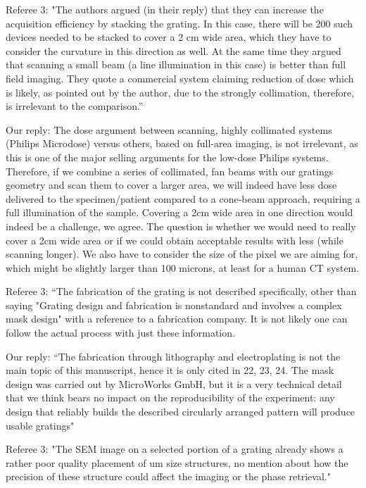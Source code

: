 \documentclass[a4paper,english]{scrartcl} \usepackage[detect-all]{siunitx}
\begin{document}
Referee 3: "The authors argued (in their reply) that they can increase the
acquisition efficiency by stacking the grating. In this case, there will be
200 such devices needed to be stacked to cover a 2 cm wide area, which they
have to consider the curvature in this direction as well. At the same time
they argued that scanning a small beam (a line illumination in this case) is
better than full field imaging. They quote a commercial system claiming
reduction of dose which is likely, as pointed out by the author, due to the
strongly collimation, therefore, is irrelevant to the comparison.”

Our reply: The dose argument between scanning, highly collimated systems
(Philips Microdose) versus others, based on full-area imaging, is not
irrelevant, as this is one of the major selling arguments for the low-dose
Philips systems. Therefore, if we combine a series of collimated, fan beams
with our gratings geometry and scan them to cover a larger area, we will
indeed have less dose delivered to the specimen/patient compared to a
cone-beam approach, requiring a full illumination of the sample. Covering a
2cm wide area in one direction would indeed be a challenge, we agree. The
question is whether we would need to really cover a 2cm wide area or if we
could obtain acceptable results with less (while scanning longer). We also
have to consider the size of the pixel we are aiming for, which might be
slightly larger than 100 microns, at least for a human CT system.

Referee 3: “The fabrication of the grating is not described specifically,
other than saying "Grating design and fabrication is nonstandard and
involves a complex mask design" with a reference to a fabrication company.
It is not likely one can follow the actual process with just these
information. 

Our reply: “The fabrication through lithography and electroplating is not
the main topic of this manuscript, hence it is only cited in 22, 23, 24. The
mask design was carried out by MicroWorks GmbH, but it is a very technical
detail that we think bears no impact on the reproducibility of the
experiment: any design that reliably builds the described circularly
arranged pattern will produce usable gratings"

Referee 3: "The SEM image on a selected portion of a grating already shows a
rather poor quality placement of um size structures, no mention about how
the precision of these structure could affect the imaging or the phase
retrieval."
\end{document}
